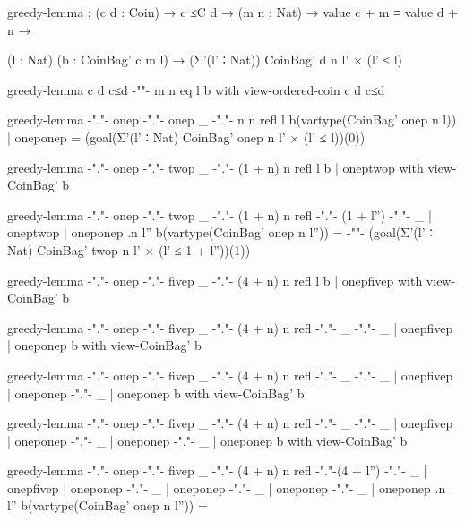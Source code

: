 \begin{sidewaysfigure}
\codefigure\fontsize{10pt}{0pt}\setlength{\blanklineskip}{-3.5pt}
\begin{code}
greedy-lemma :  (c d : Coin) → c ≤C d → (m n : Nat) → value c + m ≡ value d + n →

                (l : Nat) (b : CoinBag' c m l) → (Σ'(l' ∶ Nat)) CoinBag' d n l' × (l' ≤ l)

greedy-lemma          c               d      c≤d  {-""-}   m                n        eq             l                   b  with view-ordered-coin c d c≤d

greedy-lemma {-"."-}  onep   {-"."-}  onep   _    {-"."-}  n                n        refl           l                   b(vartype(CoinBag' onep n l))  | oneponep = (goal(Σ'(l' ∶ Nat) CoinBag' onep n l' × (l' ≤ l))(0))

greedy-lemma {-"."-}  onep   {-"."-}  twop   _    {-"."-}  (1 + n)          n        refl           l                   b  | oneptwop   with view-CoinBag' b

greedy-lemma {-"."-}  onep   {-"."-}  twop   _    {-"."-}  (1 + n)          n        refl  {-"."-}  (1 + l'')  {-"."-}  _  | oneptwop   | oneponep {.n} {l''} b(vartype(CoinBag' onep n l'')) =
{-"\hfill"-} (goal(Σ'(l' ∶ Nat) CoinBag' twop n l' × (l' ≤ 1 + l''))(1))

greedy-lemma {-"."-}  onep   {-"."-}  fivep  _    {-"."-}  (4 + n)          n        refl           l                   b  | onepfivep  with view-CoinBag' b

greedy-lemma {-"."-}  onep   {-"."-}  fivep  _    {-"."-}  (4 + n)          n        refl  {-"."-}  _          {-"."-}  _  | onepfivep  | oneponep          b  with view-CoinBag' b

greedy-lemma {-"."-}  onep   {-"."-}  fivep  _    {-"."-}  (4 + n)          n        refl  {-"."-}  _          {-"."-}  _  | onepfivep  | oneponep {-"."-}  _  | oneponep          b  with view-CoinBag' b

greedy-lemma {-"."-}  onep   {-"."-}  fivep  _    {-"."-}  (4 + n)          n        refl  {-"."-}  _          {-"."-}  _  | onepfivep  | oneponep {-"."-}  _  | oneponep {-"."-}  _  | oneponep          b  with view-CoinBag' b

greedy-lemma {-"."-}  onep   {-"."-}  fivep  _    {-"."-}  (4 + n)          n        refl  {-"."-}(4 + l'')    {-"."-}  _  | onepfivep  | oneponep {-"."-}  _  | oneponep {-"."-}  _  | oneponep {-"."-}  _  | oneponep {.n} {l''} b(vartype(CoinBag' onep n l'')) =


\end{code}
\end{sidewaysfigure}
